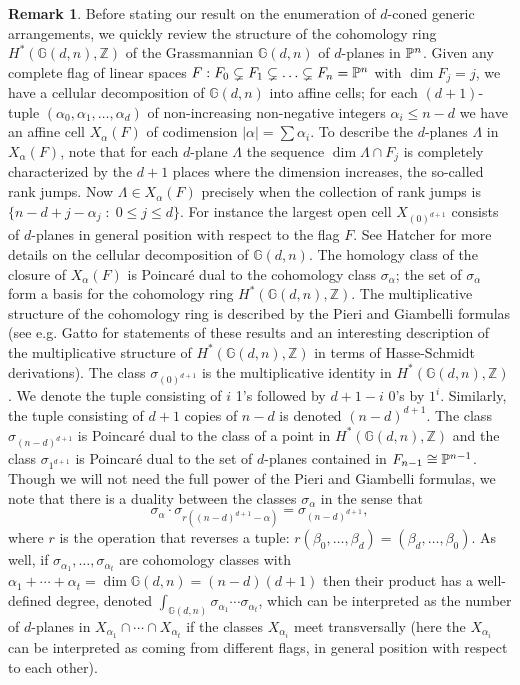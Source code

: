 \documentclass[12pt]{article}
\theoremstyle{plain}
\theoremstyle{definition}
\newtheorem{remark}[theorem]{Remark}
\newcommand{\Z}{\mathbb{Z}}
\newcommand{\G}{\mathbb{G}}
\renewcommand{\P}{\ensuremath \mathbb{P}}
\begin{document}
\begin{remark} Before stating our result on the enumeration of $d$-coned generic arrangements, 
 we quickly review the structure of the cohomology ring $H^*(\G(d,n),\Z)$ of the
Grassmannian $\G(d,n)$ of $d$-planes in $\P^n$. Given any complete
flag of linear spaces $F: F_0 \subsetneq F_1 \subsetneq \ldots
\subsetneq F_{n} = \P^n$ with $\dim F_j = j$, we have a cellular
decomposition of $\G(d,n)$ into affine cells; for each $(d+1)$-tuple
$(\alpha_0, \alpha_1, \ldots, \alpha_{d})$ of
non-increasing non-negative integers $\alpha_i \leq n-d$ we have an
affine cell $X_{\alpha}(F)$ 
of codimension $| \alpha | = \sum \alpha_i$. To describe the
$d$-planes $\Lambda$ in $X_{\alpha}(F)$, note that for each $d$-plane
$\Lambda$ the sequence $\dim \Lambda \cap F_j$ is completely
characterized by the $d+1$ places where the dimension increases, the
so-called rank jumps. Now $\Lambda \in X_{\alpha}(F)$ precisely when
the collection of rank jumps is $\{n-d+j-\alpha_j \; : \; 0 \leq j \leq
d\}$. For instance the largest open cell $X_{(0)^{d+1}}$ consists of
$d$-planes in general position with respect to the flag $F$.  See
Hatcher \cite{Hatcher} for more details on the cellular decomposition
of $\G(d,n)$. The homology class of the closure of $X_\alpha(F)$ is
Poincar\'e dual to the cohomology class $\sigma_\alpha$; the set of
$\sigma_\alpha$ form a basis for the cohomology ring
$H^*(\G(d,n),\Z)$. The multiplicative structure of the cohomology ring
is described by the Pieri and Giambelli formulas (see e.g. Gatto
\cite{GattoASC,GattoIMPA} for statements of these results and an
interesting description of the multiplicative structure of
$H^*(\G(d,n),\Z)$ in terms of Hasse-Schmidt derivations). The class 
$\sigma_{(0)^{d+1}}$ is the multiplicative identity in $H^*(\G(d,n),\Z)$.  We denote
the tuple consisting of $i$ 1's followed by $d+1-i$ 0's by
$1^i$. Similarly, the tuple consisting of $d+1$ copies of $n-d$ is
denoted $(n-d)^{d+1}$. The class $\sigma_{(n-d)^{d+1}}$ is Poincar\'e
dual to the class of a point in $H^*(\G(d,n),\Z)$ and the class
$\sigma_{1^{d+1}}$ is Poincar\'e dual to the set of $d$-planes
contained in $F_{n-1} \cong \P^{n-1}$.  Though we will not need the
full power of the Pieri and Giambelli formulas, we note that there is
a duality between the classes $\sigma_\alpha$ in the sense that
$$\sigma_\alpha \cdot \sigma_{r((n-d)^{d+1}-\alpha)} =
\sigma_{(n-d)^{d+1}},$$ where $r$ is the operation that reverses a
tuple: $r(\beta_0,\ldots,\beta_{d}) =
(\beta_d,\ldots,\beta_0)$. As well, if $\sigma_{\alpha_1}, \ldots,
\sigma_{\alpha_t}$ are cohomology classes with
$\alpha_{1}+\cdots+\alpha_t = \dim \G(d,n) = (n-d)(d+1)$ then their
product has a well-defined degree, denoted $\int_{\G(d,n)}
\sigma_{\alpha_1} \cdots \sigma_{\alpha_t}$, which can be interpreted
as the number of $d$-planes in $X_{\alpha_1} \cap \cdots \cap
X_{\alpha_t}$ if the classes $X_{\alpha_i}$ meet transversally (here
the $X_{\alpha_i}$ can be interpreted as coming from different flags,
in general position with respect to each other).
\end{remark}
\end{document}
